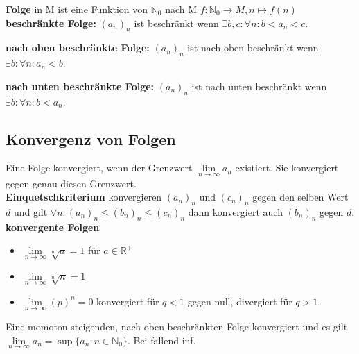 \textbf{Folge} in M ist eine Funktion von $\mathbb{N}_0$ nach M $f:\mathbb{N}_0 \to M, n \mapsto f(n)$\\

\textbf{beschränkte Folge:} $(a_n)_n$ ist beschränkt wenn $\exists b,c : \forall n: b<a_n<c$.

\textbf{nach oben beschränkte Folge:} $(a_n)_n$ ist nach oben beschränkt wenn $\exists b: \forall n: a_n<b$.

\textbf{nach unten beschränkte Folge:} $(a_n)_n$ ist nach unten beschränkt wenn $\exists b: \forall n: b<a_n$.\\

\subsection{Konvergenz von Folgen}
Eine Folge konvergiert, wenn der Grenzwert $\lim\limits_{n\to \infty} a_n$ existiert. Sie konvergiert gegen genau diesen Grenzwert.\\

\textbf{Einquetschkriterium} konvergieren $(a_n)_n$ und $(c_n)_n$ gegen den selben Wert $d$ und gilt $\forall n: (a_n)_n \leq (b_n)_n \leq (c_n)_n$ dann konvergiert auch $(b_n)_n$ gegen $d$.\\

\textbf{konvergente Folgen}
\begin{itemize}
    \item $\lim\limits_{n\to \infty} \sqrt[n]{a}=1$ für $a\in \mathbb{R}^+$
    \item $\lim\limits_{n\to \infty} \sqrt[n]{n}=1$
    \item $\lim\limits_{n\to \infty} (p)^n = 0$ konvergiert für $q<1$ gegen null, divergiert für $q>1$.
\end{itemize}

Eine momoton steigenden, nach oben beschränkten Folge konvergiert und es gilt $\lim\limits_{n\to \infty} a_n = \sup\{a_n:n\in \mathbb{N}_0\}$. Bei fallend inf.


